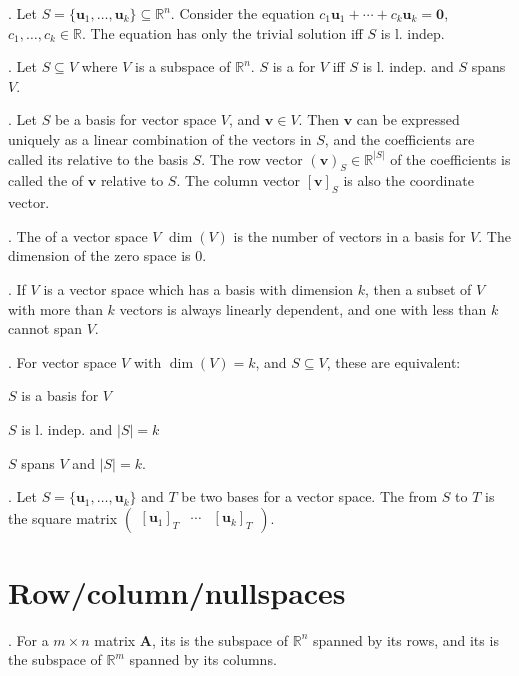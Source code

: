 \documentclass{slnotes}
\begin{document}
. Let \(S = \{\mathbf{u}_1, \hdots, \mathbf{u}_k\} \subseteq \mathbb{R}^n\). Consider the equation \(c_1\mathbf{u}_1 + \cdots + c_k\mathbf{u}_k = \mathbf{0}\), \(c_1, \hdots, c_k \in \mathbb{R}\). The equation has only the trivial solution iff \(S\) is l. indep.

. Let \(S \subseteq V\) where \(V\) is a subspace of \(\mathbb{R}^n\). \(S\) is a  for \(V\) iff \(S\) is l. indep. and \(S\) spans \(V\).

. Let \(S\) be a basis for vector space \(V\), and \(\mathbf{v} \in V\). Then \(\mathbf{v}\) can be expressed uniquely as a linear combination of the vectors in \(S\), and the coefficients are called its  relative to the basis \(S\). The row vector \((\mathbf{v})_S \in \mathbb{R}^{\lvert S \rvert}\) of the coefficients is called the  of \(\mathbf{v}\) relative to \(S\). The column vector \([\mathbf{v}]_S\) is also the coordinate vector.

. The  of a vector space \(V\) \(\dim(V)\) is the number of vectors in a basis for \(V\). The dimension of the zero space is 0.

. If \(V\) is a vector space which has a basis with dimension \(k\), then a subset of \(V\) with more than \(k\) vectors is always linearly dependent, and one with less than \(k\) cannot span \(V\).

. For vector space \(V\) with \(\dim(V) = k\), and \(S \subseteq V\), these are equivalent: \begin{slinenum}
\item \(S\) is a basis for \(V\)
\item \(S\) is l. indep. and \(\lvert S \rvert = k\)
\item \(S\) spans \(V\) and \(\lvert S \rvert = k\).
\end{slinenum}

. Let \(S = \{\mathbf{u}_1, \hdots, \mathbf{u}_k\}\) and \(T\) be two bases for a vector space. The  from \(S\) to \(T\) is the square matrix \(\begin{pmatrix}[\mathbf{u}_1]_T & \cdots & [\mathbf{u}_k]_T\end{pmatrix}\).

\chapter{Row/column/nullspaces}
. For a \(m \times n\) matrix \(\mathbf A\), its  is the subspace of \(\mathbb{R}^n\) spanned by its rows, and its  is the subspace of \(\mathbb{R}^m\) spanned by its columns.
\end{document}
